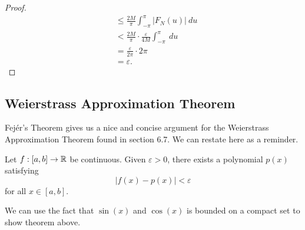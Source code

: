 \begin{enumerate}
\begin{proof}
\begin{align*}
                                     &\leq \frac{ 2M }{ \pi  } \int_{ -\pi }^{ \pi } | F_{N}(u) |   \ du \\
                                     &< \frac{ 2M    }{ \pi  } \cdot \frac{ \varepsilon }{ 4M  }  \int_{ -\pi  }^{ \pi  }   \ du \\
                                     &= \frac{ \varepsilon }{ 2\pi  } \cdot 2\pi \\ 
                                     &= \varepsilon. 
        \end{align*}
        \end{proof}
\end{enumerate}

\subsection{Weierstrass Approximation Theorem}

Fej\'{e}r's  Theorem gives us a nice and concise argument for the Weierstrass Approximation Theorem found in section 6.7. We can restate here as a reminder.

\begin{theorem}
    Let \( f : [a,b] \to \mathbb{R}  \) be continuous. Given \( \varepsilon > 0  \), there exists a polynomial \( p(x) \) satisfying 
    \[  | f(x) - p(x) | < \varepsilon \] for all \( x \in [a,b] \).
\end{theorem}

We can use the fact that \( \sin(x)  \) and \( \cos(x)  \) is bounded on a compact set to show theorem above.

